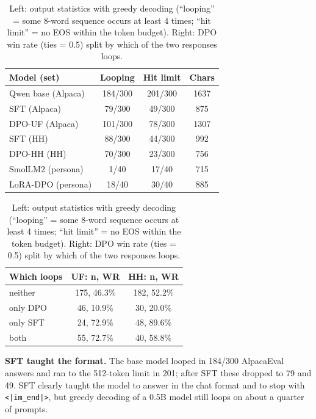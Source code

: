 \documentclass[10pt]{article}
\begin{document}
\begin{table}[h]
\centering
\small
\caption{Left: output statistics with greedy decoding (``looping'' = some 8-word sequence occurs at least 4 times; ``hit limit'' = no EOS within the token budget). Right: DPO win rate (ties = 0.5) split by which of the two responses loops.}
\label{tab:loops}
\begin{minipage}{0.52\linewidth}
\centering
\begin{tabular}{@{}lccc@{}}
\toprule
\textbf{Model (set)} & \textbf{Looping} & \textbf{Hit limit} & \textbf{Chars} \\
\midrule
Qwen base (Alpaca) & 184/300 & 201/300 & 1637 \\
SFT (Alpaca) & 79/300 & 49/300 & 875 \\
DPO-UF (Alpaca) & 101/300 & 78/300 & 1307 \\
SFT (HH) & 88/300 & 44/300 & 992 \\
DPO-HH (HH) & 70/300 & 23/300 & 756 \\
SmolLM2 (persona) & 1/40 & 17/40 & 715 \\
LoRA-DPO (persona) & 18/40 & 30/40 & 885 \\
\bottomrule
\end{tabular}
\end{minipage}\hfill
\begin{minipage}{0.45\linewidth}
\centering
\begin{tabular}{@{}lcc@{}}
\toprule
\textbf{Which loops} & \textbf{UF: n, WR} & \textbf{HH: n, WR} \\
\midrule
neither & 175, 46.3\% & 182, 52.2\% \\
only DPO & 46, 10.9\% & 30, 20.0\% \\
only SFT & 24, 72.9\% & 48, 89.6\% \\
both & 55, 72.7\% & 40, 58.8\% \\
\bottomrule
\end{tabular}
\end{minipage}
\end{table}

\textbf{SFT taught the format.} The base model looped in 184/300 AlpacaEval answers and ran to the 512-token limit in 201; after SFT these dropped to 79 and 49. SFT clearly taught the model to answer in the chat format and to stop with \texttt{<|im\_end|>}, but greedy decoding of a 0.5B model still loops on about a quarter of prompts.
\end{document}
